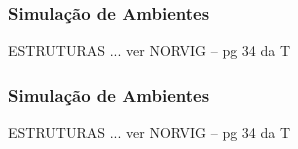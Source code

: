 \begin{frame}

    \frametitle{Simulação de Ambientes}

     ESTRUTURAS ... ver NORVIG -- pg 34 da T

\end{frame}



\begin{frame}

    \frametitle{Simulação de Ambientes}

     ESTRUTURAS ... ver NORVIG -- pg 34 da T

\end{frame}








\begin{comment}
\sectio{Aprendizagem}
\begin{frame}

    \frametitle{Aprendizagem}
    \begin{itemize}
    \pause
      \item 
\pause
      \item cap 7
    
    \end{itemize}
\end{frame}
\end{comment}
